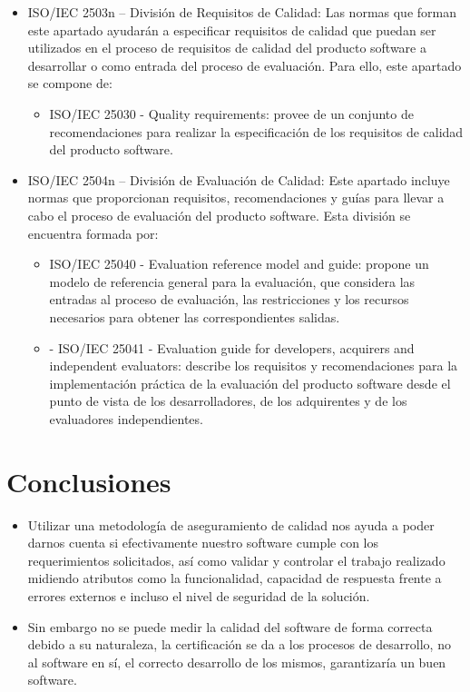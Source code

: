 \documentclass[preprint,12pt]{elsarticle}
\begin{document}
\begin{itemize}
		\item ISO/IEC 2503n – División de Requisitos de Calidad: Las normas que forman este apartado ayudarán a especificar requisitos de calidad que puedan ser utilizados en el proceso de requisitos de calidad del producto software a desarrollar o como entrada del proceso de evaluación. Para ello, este apartado se compone de:
		\begin{itemize}
			\item ISO/IEC 25030 - Quality requirements: provee de un conjunto de recomendaciones para realizar la especificación de los requisitos de calidad del producto software. 

		\end{itemize}
		
		
		\item ISO/IEC 2504n – División de Evaluación de Calidad: Este apartado incluye normas que proporcionan requisitos, recomendaciones y guías para llevar a cabo el proceso de evaluación del producto software. Esta división se encuentra formada por:

		\begin{itemize}
			\item ISO/IEC 25040 - Evaluation reference model and guide: propone un modelo de referencia general para la evaluación, que considera las entradas al proceso de evaluación, las restricciones y los recursos necesarios para obtener las correspondientes salidas.
			\item - ISO/IEC 25041 - Evaluation guide for developers, acquirers and independent evaluators: describe los requisitos y recomendaciones para la implementación práctica de la evaluación del producto software desde el punto de vista de los desarrolladores, de los adquirentes y de los evaluadores independientes.
		\end{itemize}

		


	\end{itemize}

\section{Conclusiones}
	\begin{itemize}
\item Utilizar una metodología de aseguramiento de calidad nos ayuda a poder darnos cuenta si efectivamente nuestro software cumple con los requerimientos solicitados, así como validar y controlar el trabajo realizado midiendo atributos como la funcionalidad, capacidad de respuesta frente a errores externos e incluso el nivel de seguridad de la solución.
\item Sin embargo no se puede medir la calidad del software de forma correcta debido a su naturaleza, la certificación se da a los procesos de desarrollo, no al software en sí, el correcto desarrollo de los mismos, garantizaría un buen software. 
	\end{itemize}



	\newpage
	
		
\end{document}
